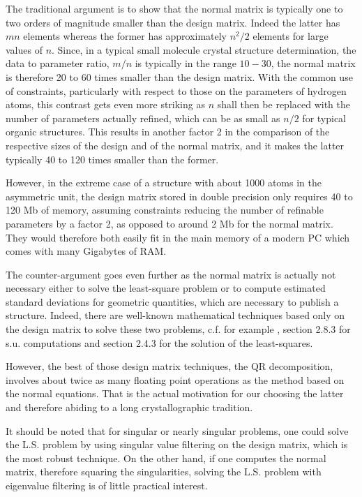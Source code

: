 \documentclass[pdf]{iucr}
\begin{document}
The traditional argument is to show that the normal matrix is typically one to two orders of magnitude smaller than the design matrix. Indeed the latter has $m n$ elements whereas the former has approximately $n^2/2$ elements for large values of $n$. Since, in a typical small molecule crystal structure determination, the data to parameter ratio, $m / n$ is typically in the range $10-30$, the normal matrix is therefore 20 to 60 times smaller than the design matrix. With the common use of constraints, particularly with respect to those on the parameters of hydrogen atoms, this contrast gets even more striking as $n$ shall then be replaced with the number of parameters actually refined, which can be as small as $n/2$ for typical organic structures. This results in another factor 2 in the comparison of the respective sizes of the design and of the normal matrix, and it makes the latter typically 40 to 120 times smaller than the former. 

However, in the extreme case of a structure with about 1000 atoms in the asymmetric unit, the design matrix stored in double precision only requires 40 to 120 Mb of memory, assuming constraints reducing the number of refinable parameters by a factor 2, as opposed to around 2 Mb for the normal matrix. They would therefore both easily fit in the main memory of a modern PC which comes with many Gigabytes of RAM.

The counter-argument goes even further as the normal matrix is actually not necessary either to solve the least-square problem or to compute estimated standard deviations for geometric quantities, which are necessary to publish a structure. Indeed, there are well-known mathematical techniques based only on the design matrix to solve these two problems, c.f. for example , section 2.8.3 for s.u. computations and section 2.4.3 for the solution of the least-squares.
 
However, the best of those design matrix techniques, the QR decomposition, involves about twice as many floating point operations as the method based on the normal equations. That is the actual motivation for our choosing the latter and therefore abiding to a long crystallographic tradition.

It should be noted that for singular or nearly singular problems, one could solve the L.S. problem by using singular value filtering on the design matrix, which is the most robust technique. On the other hand, if one computes the normal matrix, therefore squaring the singularities, solving the L.S. problem with eigenvalue filtering is of little practical interest.
\end{document}
